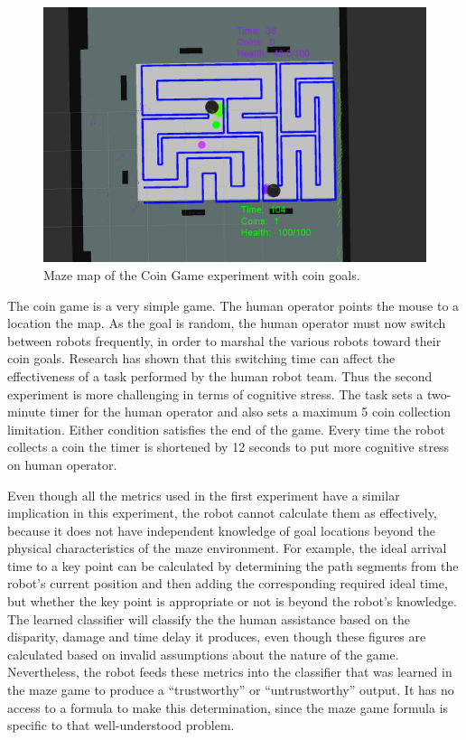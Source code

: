 \documentclass{sig-alternate}
\begin{document}
\begin{figure}  
\centering
\includegraphics[width=.5\textwidth]{coin_game_rviz.png}
\caption{Maze map of the Coin Game experiment with coin goals.}
\label{fig:coin_map}
\end{figure}

The coin game is a very simple game. The human operator points the
mouse to a location the map. As the goal is random, the human operator
must now switch between robots frequently, in order to marshal the
various robots toward their coin goals. Research
\cite{olsen2003metrics} has shown that this switching time can affect
the effectiveness of a task performed by the human robot team. Thus
the second experiment is more challenging in terms of cognitive
stress.  The task sets a two-minute timer for the human operator and
also sets a maximum 5 coin collection limitation. Either condition
satisfies the end of the game. Every time the robot collects a coin
the timer is shortened by 12 seconds to put more cognitive stress on
human operator.

Even though all the metrics used in the first experiment have a
similar implication in this experiment, the robot cannot calculate
them as effectively, because it does not have independent knowledge of
goal locations beyond the physical characteristics of the maze
environment. For example, the ideal arrival time to a key point can be
calculated by determining the path segments from the robot's current
position and then adding the corresponding required ideal time, but
whether the key point is appropriate or not is beyond the robot's
knowledge.  The learned classifier will classify the the human
assistance based on the disparity, damage and time delay it produces,
even though these figures are calculated based on invalid assumptions
about the nature of the game.  Nevertheless, the robot feeds these
metrics into the classifier that was learned in the maze game to
produce a ``trustworthy'' or ``untrustworthy'' output.  It has no
access to a formula to make this determination, since the maze game
formula is specific to that well-understood problem.
\end{document}
